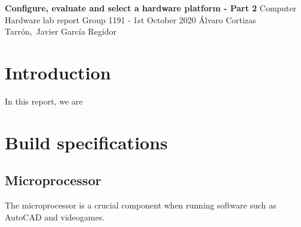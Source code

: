 \documentclass[a4paper, twoside, 11pt]{article}
\begin{document}
\begin{titlepage}
\vspace*{\fill}
\begin{center}
\thispagestyle{noheaders}
\Huge\textbf{Configure, evaluate and select a hardware platform - Part 2}
\vskip0.5cm
\large Computer Hardware lab report 
\vskip0.1cm Group 1191 - 1st October 2020 
\vskip1cm
\large Álvaro Cortizas Tarrón,\ Javier García Regidor
\vskip0.5cm
\end{center}
\vspace*{\fill}
\end{titlepage}

\thispagestyle{noheaders}
\vspace*{\fill}
\tableofcontents
\vspace*{\fill}
\newpage


\section{Introduction}
\hspace{\parindent} In this report, we are  




\section{Build specifications}

\subsection{Microprocessor}
\hspace{\parindent} The microprocessor is a crucial component when running software such as AutoCAD and videogames. 
\end{document}
